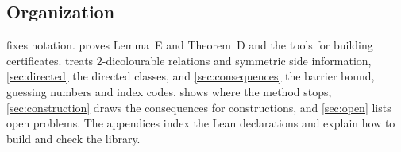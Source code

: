 \subsection{Organization}

 fixes notation.  proves Lemma~E and Theorem~D and the tools for building
certificates.  treats $2$-dicolourable relations and symmetric side information, \cref{sec:directed}
the directed classes, and \cref{sec:consequences} the barrier bound, guessing numbers and index codes. 
shows where the method stops, \cref{sec:construction} draws the consequences for constructions, and \cref{sec:open} lists
open problems. The appendices index the Lean declarations and explain how to build and check the library.
